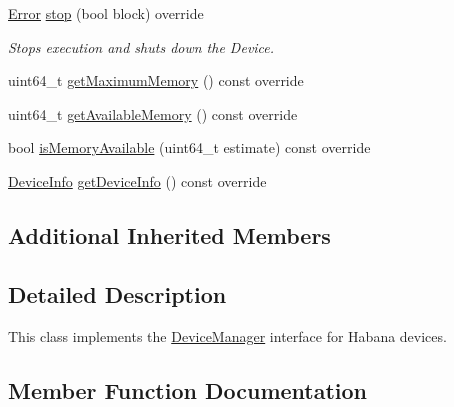 \begin{DoxyCompactItemize}
\item 
\mbox{\label{classglow_1_1runtime_1_1_habana_device_manager_a91a046755570923cf1dbb29929aa891b}} 
\hyperlink{namespaceglow_afdb176c3a672ef66db0ecfc19a8d39bf}{Error} \hyperlink{classglow_1_1runtime_1_1_habana_device_manager_a91a046755570923cf1dbb29929aa891b}{stop} (bool block) override
\begin{DoxyCompactList}\small\item\em Stops execution and shuts down the Device. \end{DoxyCompactList}\item 
uint64\+\_\+t \hyperlink{classglow_1_1runtime_1_1_habana_device_manager_a2e8ddfc33d1a4f482bcd1f9a5e4e5350}{get\+Maximum\+Memory} () const override
\item 
uint64\+\_\+t \hyperlink{classglow_1_1runtime_1_1_habana_device_manager_a9b23cdaa74210f057dd3bb6f839e0509}{get\+Available\+Memory} () const override
\item 
bool \hyperlink{classglow_1_1runtime_1_1_habana_device_manager_aadaab8c13097bb7ec64b219874549c7f}{is\+Memory\+Available} (uint64\+\_\+t estimate) const override
\item 
\hyperlink{structglow_1_1runtime_1_1_device_info}{Device\+Info} \hyperlink{classglow_1_1runtime_1_1_habana_device_manager_a5c73935d669a16b259c37b335caae76d}{get\+Device\+Info} () const override
\end{DoxyCompactItemize}
\subsection*{Additional Inherited Members}


\subsection{Detailed Description}
This class implements the \hyperlink{classglow_1_1runtime_1_1_device_manager}{Device\+Manager} interface for Habana devices. 

\subsection{Member Function Documentation}
\mbox{\label{classglow_1_1runtime_1_1_habana_device_manager_ac812a0a4b70e788e13255ad144bf792f}} 

